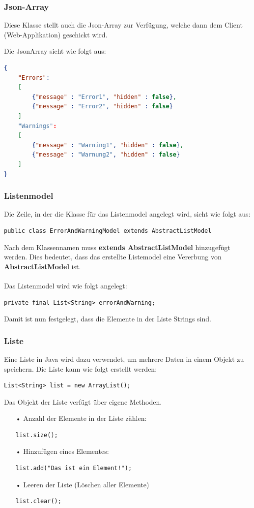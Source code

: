 \subsubsection{Json-Array} \label{subsubsec:Array}
Diese Klasse stellt auch die Json-Array zur Verfügung, welche dann dem Client (Web-Applikation) geschickt wird. 

Die JsonArray sieht wie folgt aus:

\begin{lstlisting}[language=json,firstnumber=1]
{ 
	"Errors": 
	[ 
		{"message" : "Error1", "hidden" : false}, 
		{"message" : "Error2", "hidden" : false} 
	] 
	"Warnings": 
	[ 
		{"message" : "Warning1", "hidden" : false}, 
		{"message" : "Warnung2", "hidden" : false} 
	] 
} 
\end{lstlisting}

\newpage

\subsubsection{Listenmodel}
Die Zeile, in der die Klasse für das Listenmodel angelegt wird, sieht wie folgt aus:
\begin{lstlisting}[style=JavaStyle]
	public class ErrorAndWarningModel extends AbstractListModel
\end{lstlisting}
Nach dem Klassennamen muss \textbf{extends AbstractListModel} hinzugefügt werden. Dies bedeutet, dass das erstellte Listemodel eine Vererbung von \textbf{AbstractListModel} ist.
\\ \\
Das Listenmodel wird wie folgt angelegt:
\begin{lstlisting}[style=JavaStyle]
	private final List<String> errorAndWarning;
\end{lstlisting}
Damit ist nun festgelegt, dass die Elemente in der Liste Strings sind. 

\subsubsection{Liste}
Eine Liste in Java wird dazu verwendet, um mehrere Daten in einem Objekt zu speichern. Die Liste kann wie folgt erstellt werden:
\begin{lstlisting}[style=JavaStyle]
	List<String> list = new ArrayList();
\end{lstlisting}
Das Objekt der Liste verfügt über eigene Methoden. 
\begin{itemize}
\item[•] Anzahl der Elemente in der Liste zählen: 
\begin{lstlisting}[style=JavaStyle]
	list.size();
\end{lstlisting}
\item[•] Hinzufügen eines Elementes:
\begin{lstlisting}[style=JavaStyle]
	list.add("Das ist ein Element!");
\end{lstlisting}
\item[•] Leeren der Liste (Löschen aller Elemente)
\begin{lstlisting}[style=JavaStyle]
	list.clear();
\end{lstlisting}
\end{itemize}


